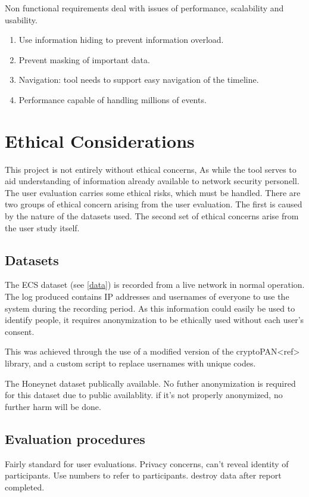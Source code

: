 Non functional requirements deal with issues of performance, scalability and usability.
\begin{enumerate}
\item{Use information hiding to prevent information overload.}
\item{Prevent masking of important data.}
\item{Navigation: tool needs to support easy navigation of the timeline.}
\item{Performance capable of handling millions of events.}
\end{enumerate}

\section{Ethical Considerations}

This project is not entirely without ethical concerns, As while the tool serves to aid understanding of information already available to network security personell. The user evaluation carries some ethical risks, which must be handled.
There are two groups of ethical concern arising from the user evaluation. The first is caused by the nature of the datasets used.  The second set of ethical concerns arise from the user study itself.

\subsection{Datasets}
The ECS dataset (see \ref{data}) is recorded from a live network in normal operation. The log produced contains IP addresses and usernames of everyone to use the system during the recording period.
As this information could easily be used to identify people, it requires anonymization to be ethically used without each user's consent.

This was achieved through the use of a modified version of the cryptoPAN<ref> library, and a custom script to replace usernames with unique codes.

The Honeynet dataset publically available. No futher anonymization is required for this dataset due to public availablity. if it's not properly anonymized, no further harm will be done. 

\subsection{Evaluation procedures}
Fairly standard for user evaluations. Privacy concerns, can't reveal identity of participants. 
Use numbers to refer to participants. destroy data after report completed. 

